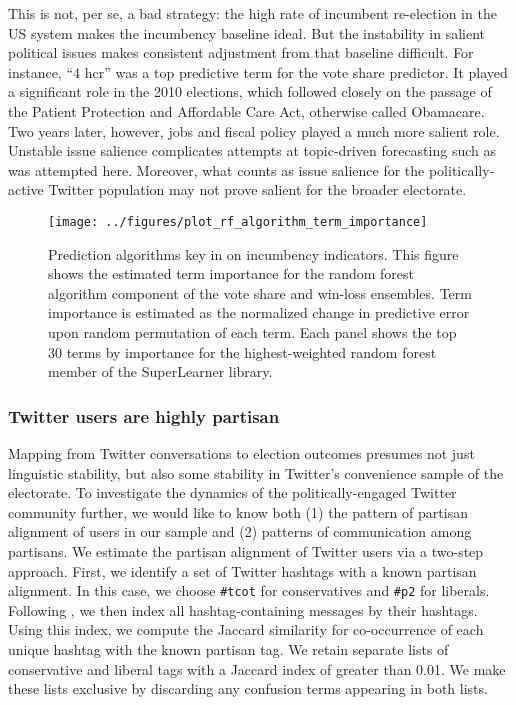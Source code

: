 \documentclass{article}
\begin{document}
This is not, per se, a bad strategy: the high rate of incumbent
re-election in the US system makes the incumbency baseline ideal. But
the instability in salient political issues makes consistent
adjustment from that baseline difficult. For instance, ``4 hcr'' was a
top predictive term for the vote share predictor. It played a
significant role in the 2010 elections, which followed closely on the
passage of the Patient Protection and Affordable Care Act, otherwise
called Obamacare. Two years later, however, jobs and fiscal policy
played a much more salient role. Unstable issue salience complicates
attempts at topic-driven forecasting such as was attempted
here. Moreover, what counts as issue salience for the
politically-active Twitter population may not prove salient for the
broader electorate. 

\begin{figure}[ht]
  \centering
  \texttt{[image: ../figures/plot\_rf\_algorithm\_term\_importance]}
  \caption{Prediction algorithms key in on incumbency
    indicators. This figure shows the estimated term importance for the random forest algorithm component
    of the vote share and win-loss ensembles. Term importance is
    estimated as the normalized change in predictive error upon
    random permutation of each term. Each panel shows the top
    30 terms by importance for the highest-weighted random forest
    member of the SuperLearner library.}
  \label{fig:rf-term-importance}
\end{figure}

\subsubsection{Twitter users are highly partisan}
\label{sec:part-cont-twitt}

Mapping from Twitter conversations to election outcomes presumes not
just linguistic stability, but also some stability in Twitter's
convenience sample of the electorate. To investigate the dynamics of the
politically-engaged Twitter community further, we would like to know
both (1) the pattern of partisan alignment of users in our sample and
(2) patterns of communication among partisans. We estimate the
partisan alignment of Twitter users via a two-step approach. First, we
identify a set of Twitter hashtags with a known partisan alignment. In
this case, we choose \texttt{\#tcot} for conservatives and
\texttt{\#p2} for liberals. Following \cite{conover2011}, we then
index all hashtag-containing messages by their hashtags. Using this
index, we compute the Jaccard similarity for co-occurrence of each
unique hashtag with the known partisan tag. We retain separate lists
of conservative and liberal tags with a Jaccard index of greater than
0.01. We make these lists exclusive by discarding any confusion terms
appearing in both lists.
\end{document}
